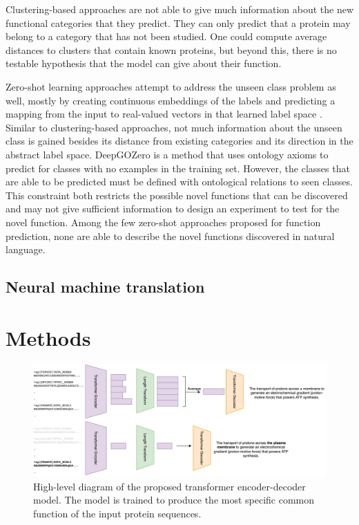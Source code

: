 \documentclass{specification}
\begin{document}
Clustering-based approaches are not able to give much information about the new functional categories that they predict.
They can only predict that a protein may belong to a category that has not been studied.
One could compute average distances to clusters that contain known proteins, but beyond this, there is no testable hypothesis that the model can give about their function.

Zero-shot learning approaches attempt to address the unseen class problem as well, mostly by creating continuous embeddings of the labels and predicting a mapping from the input to real-valued vectors in that learned label space \cite{CLIP}.
Similar to clustering-based approaches, not much information about the unseen class is gained besides its distance from existing categories and its direction in the abstract label space.
DeepGOZero \cite{DeepGOZero} is a method that uses ontology axioms to predict for classes with no examples in the training set.
However, the classes that are able to be predicted must be defined with ontological relations to seen classes.
This constraint both restricts the possible novel functions that can be discovered and may not give sufficient information to design an experiment to test for the novel function.
Among the few zero-shot approaches proposed for function prediction, none are able to describe the novel functions discovered in natural language.

\subsection{Neural machine translation}

\section{Methods}
\begin{figure}
    \centering
    \includegraphics[width=0.9\linewidth]{prot2go.png}
    \caption{High-level diagram of the proposed transformer encoder-decoder model.
The model is trained to produce the most specific common function of the input protein sequences.}
    \label{overview}
\end{figure}
\end{document}

